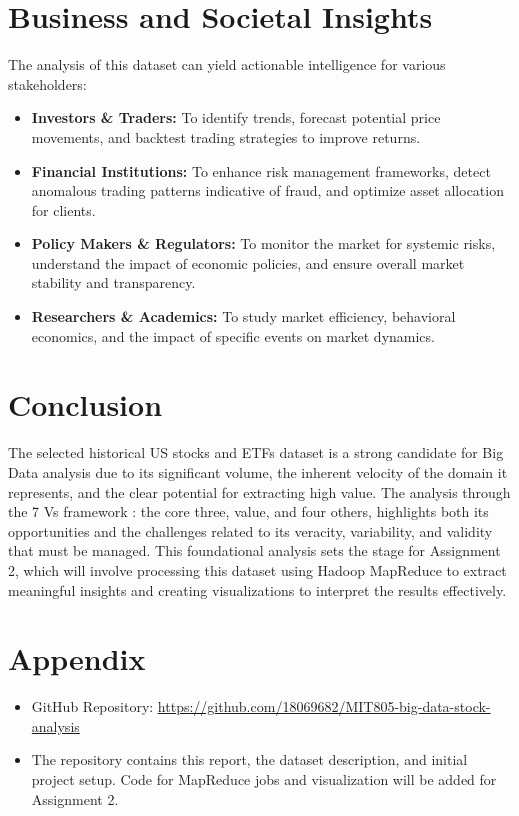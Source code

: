 \documentclass[12pt,a4paper]{article}
\begin{document}
\section{Business and Societal Insights}
The analysis of this dataset can yield actionable intelligence for various stakeholders:
\begin{itemize}
    \item \textbf{Investors \& Traders:} To identify trends, forecast potential price movements, and backtest trading strategies to improve returns.
    \item \textbf{Financial Institutions:} To enhance risk management frameworks, detect anomalous trading patterns indicative of fraud, and optimize asset allocation for clients.
    \item \textbf{Policy Makers \& Regulators:} To monitor the market for systemic risks, understand the impact of economic policies, and ensure overall market stability and transparency.
    \item \textbf{Researchers \& Academics:} To study market efficiency, behavioral economics, and the impact of specific events on market dynamics.
\end{itemize}

\section{Conclusion}
The selected historical US stocks and ETFs dataset is a strong candidate for Big Data analysis due to its significant volume, the inherent velocity of the domain it represents, and the clear potential for extracting high value. The analysis through the 7 Vs framework : the core three, value, and four others, highlights both its opportunities and the challenges related to its veracity, variability, and validity that must be managed. This foundational analysis sets the stage for Assignment 2, which will involve processing this dataset using Hadoop MapReduce to extract meaningful insights and creating visualizations to interpret the results effectively.

\section*{Appendix}
\begin{itemize}
    \item GitHub Repository: \url{https://github.com/18069682/MIT805-big-data-stock-analysis}
    \item The repository contains this report, the dataset description, and initial project setup. Code for MapReduce jobs and visualization will be added for Assignment 2.
\end{itemize}
\end{document}

